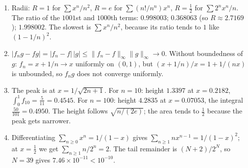 \begin{enumerate}[label=\textbf{14.\arabic*}]
  \item Radii: $R=1$ for $\sum x^{n}/n^{2}$, $R=e$ for
        $\sum(n!/n^{n})x^{n}$, $R=\tfrac12$ for $\sum2^{n}x^{n}/n$. The ratio of the
        $1001$st and $1000$th terms: $0.998003$; $0.368063$ (so
        $R\approx2.7169$); $1.998002$. The slowest is $\sum x^{n}/n^{2}$,
        because its ratio tends to $1$ like $(1-1/n)^{2}$.

  \item $\lvert f_{n}g-fg\rvert=\lvert f_{n}-f\rvert\,\lvert g\rvert
        \le\lVert f_{n}-f\rVert_{\infty}\lVert g\rVert_{\infty}\to0$. Without
        boundedness of $g$: $f_{n}=x+1/n\to x$ uniformly on $(0,1)$, but
        $(x+1/n)/x=1+1/(nx)$ is unbounded, so $f_{n}g$ does not converge
        uniformly.

  \item The peak is at $x=1/\sqrt{2n+1}$. For $n=10$: height $1.3397$ at
        $x=0.2182$, $\int_{0}^{1}f_{10}=\tfrac{5}{11}=0.4545$. For
        $n=100$: height $4.2835$ at $x=0.07053$, the integral
        $\tfrac{50}{101}=0.4950$. The height follows $\sqrt{n/(2e)}$; the area
        tends to $\tfrac12$ because the peak gets narrower.

  \item Differentiating $\sum_{n\ge0}x^{n}=1/(1-x)$ gives
        $\sum_{n\ge1}nx^{n-1}=1/(1-x)^{2}$; at $x=\tfrac12$ we get
        $\sum_{n\ge1}n/2^{n}=2$. The tail remainder is $(N+2)/2^{N}$, so
        $N=39$ gives $7.46\times10^{-11}<10^{-10}$.
\end{enumerate}

